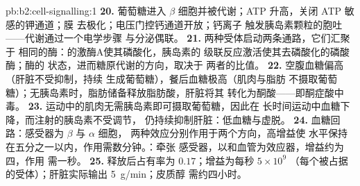 \begin{solution}{pb:b2:cell-signalling:1}
\textbf{20.} 葡萄糖进入 $\beta$ 细胞并被代谢；ATP
升高，关闭 ATP 敏感的钾通道；膜
去极化；电压门控钙通道开放；钙离子
触发胰岛素颗粒的胞吐——代谢通过一个电学步骤
与分泌偶联。
\textbf{21.} 两种受体启动两条通路，它们汇聚于
相同的酶：的激酶A使其磷酸化，胰岛素的
级联反应激活使其去磷酸化的磷酸酶；酶的
状态，进而糖原代谢的方向，取决于
两者的比值。
\textbf{22.} 空腹血糖偏高（肝脏不受抑制，持续
生成葡萄糖），餐后血糖极高（肌肉与脂肪
不摄取葡萄糖）；无胰岛素时，脂肪储备释放脂肪酸，肝脏将其
转化为酮酸——即酮症酸中毒。
\textbf{23.} 运动中的肌肉无需胰岛素即可摄取葡萄糖，因此在
长时间运动中血糖下降，而注射的胰岛素不受调节，
仍持续抑制肝脏：低血糖与虚脱。
\textbf{24.} 血糖回路：感受器为 $\beta$ 与 $\alpha$ 细胞，
两种效应分别作用于两个方向，高增益使
水平保持在五分之一以内，作用需数分钟。：牵张
感受器，以和血管为效应器，增益约为四，作用
需一秒。
\textbf{25.} 释放后占有率为 $0.17$；增益为每秒 $5\times 10^{9}$
（每个被占据的受体）；肝脏实际输出 \qty{5}{g/min}；皮质醇
需约四小时。
\end{solution}
